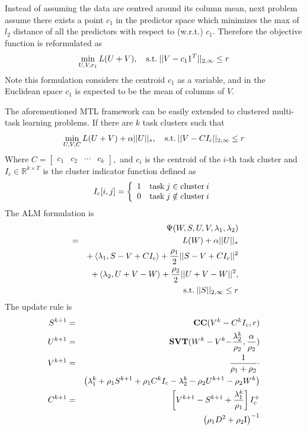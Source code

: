 \documentclass[twoside,leqno,twocolumn]{article}
\begin{document}
Instead of assuming the data are centred around its column mean, next problem assume there exists a point $c_{1}$
in the predictor space which minimizes the max of $l_{2}$ distance
of all the predictors with respect to (w.r.t.) $c_{1}$. Therefore the
objective function is reformulated as 
\begin{equation}
{\mathop {\min }\limits_{U,V,{c_1}} L(U+V),\quad{\rm{s.t.}}\:||V - {c_1}{1^T}|{|_{2,\infty }} \le r}
\label{eq:probform:c1}
\end{equation}
Note this formulation considers the centroid $c_{1}$ as a variable,
and in the Euclidean space $c_{1}$ is expected to be the mean of columns
of $V$.

The aforementioned MTL framework can be easily extended to clustered
multi-task learning problems. If there are $k$ task clusters such that 
\begin{equation}
{\mathop {\min }\limits_{U,V,C} L(U + V) + \alpha ||U|{|_*},\quad{\rm{s.t.}}\:||V - C{I_c}|{|_{2,\infty }} \le r}
\label{eq:clusterMTL}
\end{equation}
Where $C=[\begin{array}{cccc}
{c_{1}} & {c_{2}} & \cdots & {c_{k}}\end{array}],$ and $c_{i}$ is the centroid of the $i$-th task cluster and ${I_{c}}\in{\mathbb{R}^{k\times T}}$ is the cluster indicator
function defined as 
\begin{equation}
{I_c}[i,j] = \left\{ {\begin{array}{*{20}{c}}
1&{{\rm{task}}\:j \in {\rm{cluster}}\: i}\\
0&{{\rm{task}}\:j \notin {\rm{cluster}}\: i}
\end{array}} \right.
\end{equation}
The ALM formulation is
%
\begin{eqnarray}
\nonumber
&& \Psi (W,S,U,V,{\lambda _1},{\lambda _2})\\
\nonumber
&=& L(W) + \alpha ||U|{|_*}\\
\nonumber
&&  + \left\langle {{\lambda _1},S - V + C{I_c}} \right\rangle + \frac{{{\rho _1}}}{2}||S - V + C{I_c}|{|^2} \\
\nonumber
&& { + \left\langle {{\lambda _2},U + V - W} \right\rangle  + \frac{{{\rho _2}}}{2}||U + V - W|{|^2},}\\
&& {\:{\rm{s.t.}}\:||S|{|_{2,\infty }} \le r}
\end{eqnarray}
%
The update rule is
\begin{eqnarray}
\nonumber
{S^{k + 1}} &=& {\bf{CC}}({V^k} - {C^k}{I_c},r)\\
\nonumber
{U^{k+1}} &=& {\rm {\textbf{SVT}}}({W^{k}}-{V^{k}}{\rm {-}}\frac{{\lambda^k_{2}}}{{\rho_{2}}},\frac{\alpha}{{\rho_{2}}})\\
\nonumber
{V^{k + 1}} &=& \frac{1}{{{\rho _1} + {\rho _2}}}\cdot\\
\nonumber
&&\left( {{\lambda^k _1} + {\rho _1}{S^{k+1}} + {\rho _1}{C^k}{I_c} - {\lambda^k _2} - {\rho _2}{U^{k+1}} - {\rho _2}{W^k}} \right)\\
\nonumber
{C^{k + 1}} &=& \left[ {V^{k+1} - S^{k+1} + \frac{{{\lambda^k _1}}}{{{\rho _1}}}} \right]{I_c ^ + }\\
&&{\left({{\rho_{1}}{D^{2}}+{\rho_{2}}{\rm {I}}}\right)^{-1}}
\label{eq:admm3}
\end{eqnarray}
\end{document}
